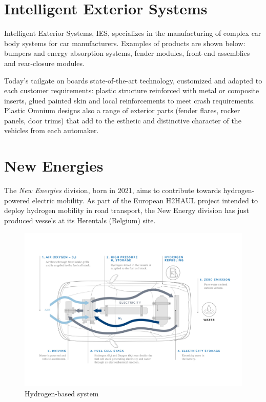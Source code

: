 \section{Intelligent Exterior Systems}

Intelligent Exterior Systems, IES, specializes in the manufacturing of complex car
body systems for car manufacturers. Examples of products are shown below: bumpers and
energy absorption systems, fender modules, front-end assemblies and rear-closure modules.

Today’s tailgate on boards state-of-the-art technology, customized and adapted to each customer requirements: plastic structure reinforced with metal or composite inserts, glued painted skin and local reinforcements to meet crash requirements.
Plastic Omnium designs also a range of exterior parts (fender flares, rocker panels, door trims) that add to the esthetic and distinctive character of the vehicles from each automaker.

\section{New Energies}

The \textit{New Energies} division, born in 2021, aims to contribute towards hydrogen-powered electric mobility. As part of the European H2HAUL project intended to deploy hydrogen mobility in road transport, the New Energy division has just produced vessels at its Herentals (Belgium) site. 

\begin{figure}
\centerline{\includegraphics[scale=0.2]{images/appendix_A/plastic-omnium-voiture-zero-emission-legendes-scaled.jpg}}
\caption{Hydrogen-based system}
\label{fig:Hydrogen-based system}
\end{figure}
